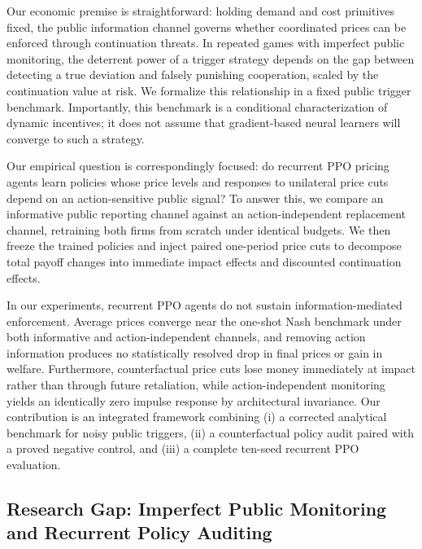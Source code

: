 \documentclass{article}
\begin{document}
Our economic premise is straightforward: holding demand and cost primitives fixed, the public information channel governs whether coordinated prices can be enforced through continuation threats. In repeated games with imperfect public monitoring, the deterrent power of a trigger strategy depends on the gap between detecting a true deviation and falsely punishing cooperation, scaled by the continuation value at risk. We formalize this relationship in a fixed public trigger benchmark. Importantly, this benchmark is a conditional characterization of dynamic incentives; it does not assume that gradient-based neural learners will converge to such a strategy.

Our empirical question is correspondingly focused: do recurrent PPO pricing agents learn policies whose price levels and responses to unilateral price cuts depend on an action-sensitive public signal? To answer this, we compare an informative public reporting channel against an action-independent replacement channel, retraining both firms from scratch under identical budgets. We then freeze the trained policies and inject paired one-period price cuts to decompose total payoff changes into immediate impact effects and discounted continuation effects.

In our experiments, recurrent PPO agents do not sustain information-mediated enforcement. Average prices converge near the one-shot Nash benchmark under both informative and action-independent channels, and removing action information produces no statistically resolved drop in final prices or gain in welfare. Furthermore, counterfactual price cuts lose money immediately at impact rather than through future retaliation, while action-independent monitoring yields an identically zero impulse response by architectural invariance. Our contribution is an integrated framework combining (i) a corrected analytical benchmark for noisy public triggers, (ii) a counterfactual policy audit paired with a proved negative control, and (iii) a complete ten-seed recurrent PPO evaluation.

\subsection{Research Gap: Imperfect Public Monitoring and Recurrent Policy Auditing}
\end{document}
